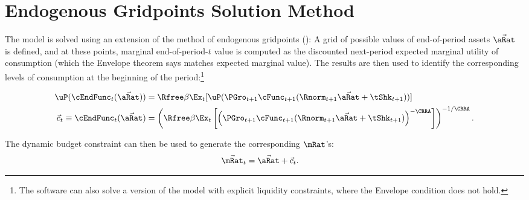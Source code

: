 \documentclass[\econtexRoot/BufferStockTheory]{subfiles}
\begin{document}
\section{Endogenous Gridpoints Solution Method}\label{sec:ApndxSolnMethEndogGpts}

The model is solved using an extension of the method of endogenous gridpoints (\cite{carrollEGM}): A grid of possible values of end-of-period assets $\vec{\aRat}$ is defined, and at these points, marginal end-of-period-$t$ value is computed as the discounted next-period expected marginal utility of consumption (which the Envelope theorem says matches expected marginal value).  The results are then used to identify the corresponding levels of consumption at the beginning of the period:\footnote{The software can also solve a version of the model with explicit liquidity constraints, where the Envelope condition does not hold.}

\begin{align}
  \uP(\cEndFunc_{t}(\vec{\aRat}))  & = \Rfree \beta \Ex_{t}[ \uP(\PGro_{t+1}
  \cFunc_{t+1}(\Rnorm_{t+1}\vec{\aRat} + \tShk_{t+1}))] \label{eq:cEulerEndog}
\\ \vec{c}_{t} \equiv \cEndFunc_{t}(\vec{\aRat})  & = \left(\Rfree \beta \Ex_{t}\left[ \left(\PGro_{t+1}
      \cFunc_{t+1}(\Rnorm_{t+1}\vec{\aRat} +
      \tShk_{t+1})\right)^{-\CRRA}\right]\right)^{-1/\CRRA}. \notag
\end{align}

The dynamic budget constraint can then be used to generate the corresponding $\mRat$'s:
\begin{eqnarray*}
  \vec{\mRat}_{t}  & = \vec{\aRat}+\vec{c}_{t}.
\end{eqnarray*}
\end{document}
